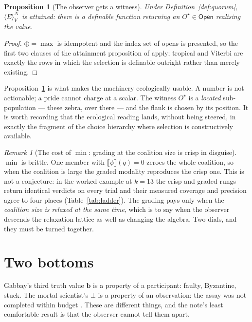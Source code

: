 \documentclass[11pt,a4paper]{article}
\theoremstyle{plain}
\newtheorem{proposition}[theorem]{Proposition}
\theoremstyle{definition}
\theoremstyle{remark}
\newtheorem{remark}[theorem]{Remark}
\newcommand{\Open}{\mathsf{Open}}
\newcommand{\gE}[2]{\langle E\rangle^{#1}_{#2}}
\newcommand{\Nsp}{\mathcal{N}}
\newcommand{\Val}{V}
\newcommand{\sem}[1]{\llbracket #1 \rrbracket}
\newcommand{\bv}{\mathbf{b}}
\begin{document}
\begin{proposition}[The observer gets a witness]\label{prop:witness}
Under Definition~\ref{def:quorum}, $\gE{\Nsp}{\Val}$ is \emph{attained}: there
is a definable function returning an $O^\star \in \Open$ realising the value.
\end{proposition}

\begin{proof}
$\oplus = \max$ is idempotent and the index set of opens is presented, so the
first two clauses of the attainment proposition of \cite{choicef} apply;
tropical and Viterbi are exactly the rows in which the selection is definable
outright rather than merely existing.
\end{proof}

Proposition~\ref{prop:witness} is what makes the machinery ecologically
usable. A number is not actionable; a pride cannot charge at a scalar. The
witness $O^\star$ is a \emph{located} sub-population --- these zebra, over
there --- and the flank is chosen by its position. It is worth recording that
the ecological reading lands, without being steered, in exactly the fragment of
the choice hierarchy where selection is constructively available.

\begin{remark}[The cost of $\min$: grading at the coalition size is crisp in
disguise]\label{rem:brittle}
$\min$ is brittle. One member with $\sem{\psi}(q) = 0$ zeroes the whole
coalition, so when the coalition is large the graded modality reproduces the
crisp one. This is not a conjecture: in the worked example at $k=13$ the crisp
and graded rungs return identical verdicts on every trial and their measured
coverage and precision agree to four places (Table~\ref{tab:ladder}). The
grading pays only when the \emph{coalition size is relaxed at the same time},
which is to say when the observer descends the relaxation lattice as well as
changing the algebra. Two dials, and they must be turned together.
\end{remark}

\section{Two bottoms}\label{sec:bottoms}

Gabbay's third truth value $\bv$ is a property of a participant: faulty,
Byzantine, stuck. The mortal scientist's $\bot$ is a property of an
observation: the assay was not completed within budget \cite[\S4]{scientist}.
These are different things, and the note's least comfortable result is that the
observer cannot tell them apart.
\end{document}
